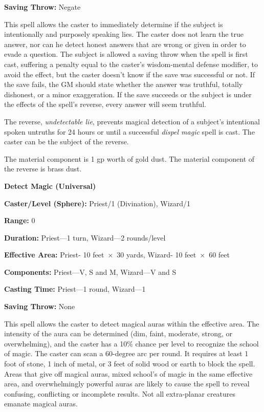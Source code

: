 \begin{multicols}{2}
\begin{minipage}{\columnwidth}
\noindent \textbf{Saving Throw:} Negate

\end{minipage}

This spell allows the caster to immediately determine if the subject is intentionally and purposely speaking lies.  The caster does not learn the true answer, nor can he detect honest answers that are wrong or given in order to evade a question.  The subject is allowed a saving throw when the spell is first cast, suffering a penalty equal to the caster's wisdom-mental defense modifier, to avoid the effect, but the caster doesn't know if the save was successful or not.  If the save fails, the GM should state whether the answer was truthful, totally dishonest, or a minor exaggeration.  If the save succeeds or the subject is under the effects of the spell's reverse, every answer will seem truthful.

The reverse, \textit{undetectable lie}, prevents magical detection of a subject's intentional spoken untruths for 24 hours or until a successful \textit{dispel magic} spell is cast.  The caster can be the subject of the reverse. 

The material component is 1 gp worth of gold dust.  The material component of the reverse is brass dust.

\vspace{1em}

\noindent
\begin{minipage}{\columnwidth}

\noindent \textbf{Detect Magic (Universal)}

\noindent \textbf{Caster/Level (Sphere):} Priest/1 (Divination), Wizard/1

\noindent \textbf{Range:} 0

\noindent \textbf{Duration:} Priest---1 turn, Wizard---2 rounds/level

\noindent \textbf{Effective Area:} Priest- 10 feet~$\times$~30 yards, Wizard- 10 feet~$\times$~60 feet

\noindent \textbf{Components:} Priest---V, S and M, Wizard---V and S

\noindent \textbf{Casting Time:} Priest---1 round, Wizard---1

\noindent \textbf{Saving Throw:} None

\end{minipage}

This spell allows the caster to detect magical auras within the effective area.  The intensity of the aura can be determined (dim, faint, moderate, strong, or overwhelming), and the caster has a 10\% chance per level to recognize the school of magic.  The caster can scan a 60-degree arc per round.  It requires at least 1 foot of stone, 1 inch of metal, or 3 feet of solid wood or earth to block the spell.  Areas that give off magical auras, mixed school's of magic in the same effective area, and overwhelmingly powerful auras are likely to cause the spell to reveal confusing, conflicting or incomplete results.  Not all extra-planar creatures emanate magical auras.


\end{multicols}
